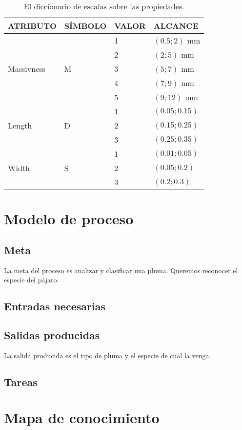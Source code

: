 \documentclass[a4paper,12pt]{article}
\begin{document}
\begin{table}[H]
	\centering
	\begin{tabular}{|l|l|l|l|}
		\hline
		ATRIBUTO                    & SÍMBOLO            & VALOR & ALCANCE       \\ \hline\hline
		\multirow{5}{*}{Massivness} & \multirow{5}{*}{M} & 1     & $(0.5;2)$ mm  \\ \cline{3-4}
		                            &                    & 2     & $(2;5)$ mm    \\ \cline{3-4}
		                            &                    & 3     & $(5;7)$ mm    \\ \cline{3-4}
		                            &                    & 4     & $(7;9)$ mm    \\ \cline{3-4}
		                            &                    & 5     & $(9;12)$ mm   \\ \hline\hline
		\multirow{3}{*}{Length}     & \multirow{3}{*}{D} & 1     & $(0.05;0.15)$ \\ \cline{3-4}
		                            &                    & 2     & $(0.15;0.25)$ \\ \cline{3-4}
		                            &                    & 3     & $(0.25;0.35)$ \\ \hline\hline
		\multirow{3}{*}{Width}      & \multirow{3}{*}{S} & 1     & $(0.01;0.05)$ \\ \cline{3-4}
		                            &                    & 2     & $(0.05;0.2)$  \\ \cline{3-4}
		                            &                    & 3     & $(0.2;0.3)$   \\ \hline
	\end{tabular}
	\caption{El diccionario de escalas sobre las propiedades.}
\end{table}

\section{Modelo de proceso}
\subsection{Meta}
La meta del proceso es analizar y clasificar una pluma. Queremos reconocer el especie del pájaro.

\subsection{Entradas necesarias}

\subsection{Salidas producidas}
La salida producida es el tipo de pluma y el especie de cual la venga.

\subsection{Tareas}

\section{Mapa de conocimiento}
\end{document}
